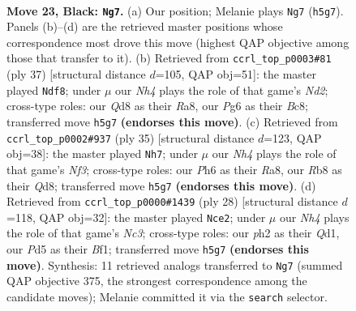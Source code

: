 \documentclass[11pt]{article}
\begin{document}
\clearpage

\begin{figure}[p]\centering
\begin{subfigure}{0.46\textwidth}\centering
\resizebox{\linewidth}{!}{%
\newchessgame
\chessboard[
  setfen={1rbq1r1k/p1n5/5bpp/2pp1p1n/P4P2/1P3NP1/Q2NP1BP/1RB1R1K1 b - - 3 23},
  showmover=false,
  pgfstyle=straightmove, color=movearrow, markmove={h5-g7}
]}
\caption{}
\end{subfigure}\hfill
\begin{subfigure}{0.46\textwidth}\centering
\resizebox{\linewidth}{!}{%
\newchessgame
\chessboard[
  setfen={r1bqr1k1/3nbp1p/1p2n1p1/1P1pP3/2pP4/5N2/2B1NPPP/1RBQR1K1 b - - 1 19},
  showmover=false,
  pgfstyle=straightmove, color=movearrow, markmove={d7-f8}
]}
\caption{}
\end{subfigure}
\\[4pt]
\begin{subfigure}{0.46\textwidth}\centering
\resizebox{\linewidth}{!}{%
\newchessgame
\chessboard[
  setfen={r2qr1k1/4bpp1/bpp2n1p/p7/Pn1PP3/2N4P/1P2NBP1/1BRQ1RK1 b - - 0 18},
  showmover=false,
  pgfstyle=straightmove, color=movearrow, markmove={f6-h7}
]}
\caption{}
\end{subfigure}\hfill
\begin{subfigure}{0.46\textwidth}\centering
\resizebox{\linewidth}{!}{%
\newchessgame
\chessboard[
  setfen={rn1qk2r/1b1n1pp1/p3p2p/2bpP3/3N1PPP/2N1B3/1PP2K2/R2Q1B1R w kq - 2 15},
  showmover=false,
  pgfstyle=straightmove, color=movearrow, markmove={c3-e2}
]}
\caption{}
\end{subfigure}
\caption{\textbf{Move 23, Black: \texttt{Ng7}.} (a) Our position; Melanie plays \texttt{Ng7} (\texttt{h5g7}). Panels (b)--(d) are the retrieved master positions whose correspondence most drove this move (highest QAP objective among those that transfer to it). (b) Retrieved from \texttt{ccrl\_top\_p0003\#81} (ply 37) [structural distance $d$=105, QAP obj=51]: the master played \texttt{Ndf8}; under $\mu$ our \emph{Nh4} plays the role of that game's \emph{Nd2}; cross-type roles: our \emph{Q}d8 as their \emph{R}a8, our \emph{P}g6 as their \emph{B}c8; transferred move \texttt{h5g7} \textbf{(endorses this move)}. (c) Retrieved from \texttt{ccrl\_top\_p0002\#937} (ply 35) [structural distance $d$=123, QAP obj=38]: the master played \texttt{Nh7}; under $\mu$ our \emph{Nh4} plays the role of that game's \emph{Nf3}; cross-type roles: our \emph{P}h6 as their \emph{R}a8, our \emph{R}b8 as their \emph{Q}d8; transferred move \texttt{h5g7} \textbf{(endorses this move)}. (d) Retrieved from \texttt{ccrl\_top\_p0000\#1439} (ply 28) [structural distance $d$=118, QAP obj=32]: the master played \texttt{Nce2}; under $\mu$ our \emph{Nh4} plays the role of that game's \emph{Nc3}; cross-type roles: our \emph{p}h2 as their \emph{Q}d1, our \emph{P}d5 as their \emph{B}f1; transferred move \texttt{h5g7} \textbf{(endorses this move)}. Synthesis: 11 retrieved analogs transferred to \texttt{Ng7} (summed QAP objective 375, the strongest correspondence among the candidate moves); Melanie committed it via the \texttt{search} selector.}
\label{fig:thought-m45}
\end{figure}
\end{document}
